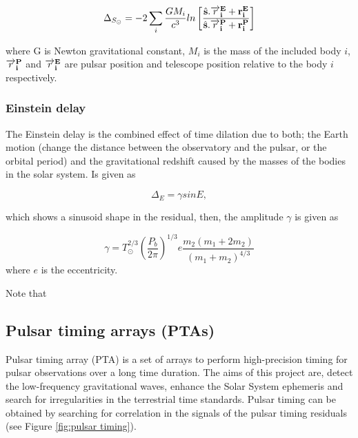 \begin{equation}
\Delta_{S_{\odot}} = -2 \sum_{i} \frac{GM_i}{c^3} ln \left[ \frac{ \hat {\bf s}.\bf{\overrightarrow r^E_i}  + r^E_i}{  \hat {\bf s}.\bf{\overrightarrow r^P_i}  + r^P_i } \right]
\end{equation}

where G is Newton gravitational constant, $M_i$ is the mass of the included body $i$, $\bf{\overrightarrow r^P_i}$ and $\bf{\overrightarrow r^E_i}$ are pulsar position and telescope position relative to the body $i$ respectively.
 
 
\subsubsection*{Einstein delay}
The Einstein delay is the combined effect of time dilation due to both; the Earth motion (change the distance between the observatory and the pulsar, or the orbital period) and the gravitational redshift caused by the masses of the bodies in the solar system. Is given as 

\begin{equation}
\Delta_E = \gamma sin E,
\end{equation}

which shows a sinusoid shape in the residual, then, the amplitude $\gamma $ is given as

\begin{equation}
\gamma = T^{2/3}_{\odot} \left(\frac{P_b}{2\pi} \right)^{1/3} e \frac{m_2(m_1 + 2m_2)}{(m_1+m_2)^{4/3}}
\end{equation}
where $e$ is the eccentricity.

Note that


\subsection{Pulsar timing arrays (PTAs)}
Pulsar timing array (PTA) is a set of arrays to perform high-precision timing for pulsar observations over a long time duration. The aims of this project are, detect the low-frequency gravitational waves, enhance the Solar System ephemeris and search for irregularities in the terrestrial time standards.
Pulsar timing can be obtained by searching for correlation in the signals of the pulsar timing residuals (see Figure \ref{fig:pulsar timing}). \citet{hobbs2009pulsar}\\

